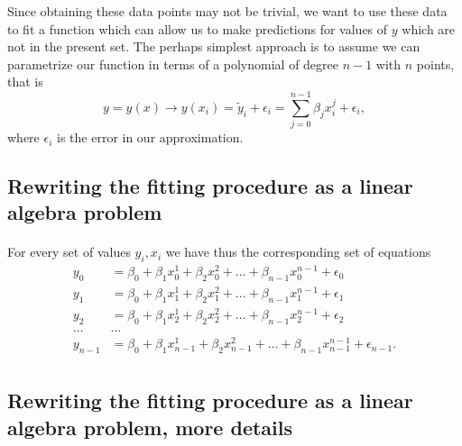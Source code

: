 \documentclass[%
oneside,                 %
final,                   %
10pt]{article}
\begin{document}
Since obtaining these data points may not be trivial, we want to use these data to fit a function which can allow us to make predictions for values of $y$ which are not in the present set. The perhaps simplest approach is to assume we can parametrize our function in terms of a polynomial of degree $n-1$ with $n$ points, that is
\[
y=y(x) \rightarrow y(x_i)=\tilde{y}_i+\epsilon_i=\sum_{j=0}^{n-1} \beta_j x_i^j+\epsilon_i,
\]
where $\epsilon_i$ is the error in our approximation.




\subsection*{Rewriting the fitting procedure as a linear algebra problem}

\paragraph{}
For every set of values $y_i,x_i$ we have thus the corresponding set of equations
\begin{align*}
y_0&=\beta_0+\beta_1x_0^1+\beta_2x_0^2+\dots+\beta_{n-1}x_0^{n-1}+\epsilon_0\\
y_1&=\beta_0+\beta_1x_1^1+\beta_2x_1^2+\dots+\beta_{n-1}x_1^{n-1}+\epsilon_1\\
y_2&=\beta_0+\beta_1x_2^1+\beta_2x_2^2+\dots+\beta_{n-1}x_2^{n-1}+\epsilon_2\\
\dots & \dots \\
y_{n-1}&=\beta_0+\beta_1x_{n-1}^1+\beta_2x_{n-1}^2+\dots+\beta_{n-1}x_{n-1}^{n-1}+\epsilon_{n-1}.\\
\end{align*}




\subsection*{Rewriting the fitting procedure as a linear algebra problem, more details}

\end{document}
